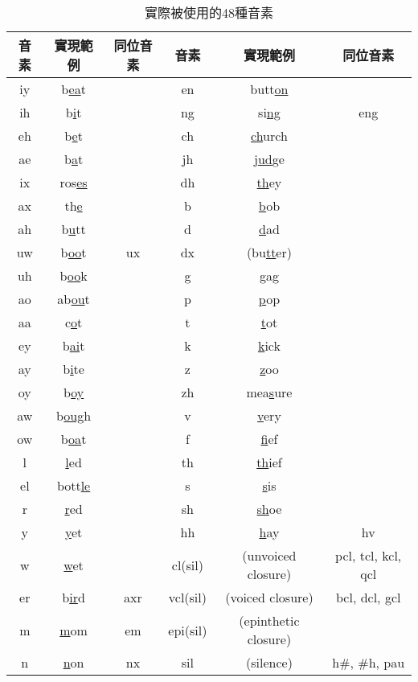   \begin{table}
    \begin{center}
    \scalebox{0.7} 
    {
      \begin{tabular}{|c|c|c|c|c|c|}
      \hline 音素 & 實現範例 & 同位音素 & 音素 & 實現範例 & 同位音素 \\ 
      \hline iy & b\underline{ea}t &  & en & butt\underline{on} &  \\ 
      \hline ih & b\underline{i}t &  & ng & si\underline{ng} & eng \\ 
      \hline eh & b\underline{e}t &  & ch & \underline{ch}urch &  \\ 
      \hline ae & b\underline{a}t &  & jh & j\underline{ud}ge &  \\ 
      \hline ix & ros\underline{es} &  & dh & \underline{th}ey &  \\ 
      \hline ax & th\underline{e} &  & b & \underline{b}ob &  \\ 
      \hline ah & b\underline{u}tt &  & d & \underline{d}ad &  \\ 
      \hline uw & b\underline{oo}t & ux & dx & (bu\underline{tt}er) &  \\ 
      \hline uh & b\underline{oo}k &  & g & \underline{g}ag &  \\ 
      \hline ao & ab\underline{ou}t &  & p & \underline{p}op &  \\ 
      \hline aa & c\underline{o}t &  & t & \underline{t}ot &  \\ 
      \hline ey & b\underline{ai}t &  & k & \underline{k}ick &  \\ 
      \hline ay & b\underline{i}te &  & z & \underline{z}oo &  \\ 
      \hline oy & b\underline{oy} &  & zh & mea\underline{s}ure &  \\ 
      \hline aw & b\underline{oug}h &  & v & \underline{v}ery &  \\ 
      \hline ow & b\underline{oa}t &  & f & \underline{f}ief &  \\ 
      \hline l & \underline{l}ed &  & th & \underline{th}ief &  \\ 
      \hline el & bott\underline{le} &  & s & \underline{s}is &  \\ 
      \hline r & \underline{r}ed &  & sh & \underline{sh}oe &  \\ 
      \hline y & \underline{y}et &  & hh & \underline{h}ay & hv \\ 
      \hline w & \underline{w}et &  & cl(sil) & (unvoiced closure) & pcl, tcl, kcl, qcl \\ 
      \hline er & b\underline{ir}d & axr & vcl(sil) & (voiced closure) & bcl, dcl, gcl \\ 
      \hline m & \underline{m}om & em & epi(sil) & (epinthetic closure) &  \\ 
      \hline n & \underline{n}on & nx & sil & (silence) & h\#, \#h, pau \\ 
      \hline
      \end{tabular} 
    }
    \end{center}
    \caption{實際被使用的48種音素}
    \label{tab:timit_48phoneme}
  \end{table}

